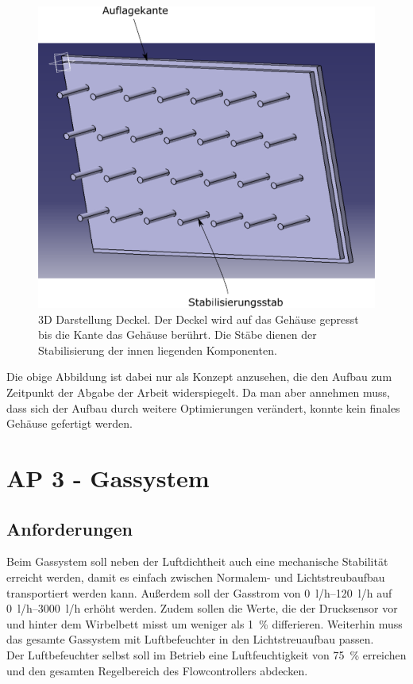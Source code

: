 \begin{figure}[h!]
	\begin{center}
		\includegraphics[scale=0.45]{Elektronik_Gehaeuse1.png}
		\caption[Gehäuse Deckel]{3D Darstellung Deckel. Der Deckel wird auf das Gehäuse gepresst bis die Kante das Gehäuse berührt. Die Stäbe dienen der Stabilisierung der innen liegenden Komponenten.}
	\end{center}
\end{figure}

Die obige Abbildung ist dabei nur als Konzept anzusehen, die den Aufbau zum Zeitpunkt der Abgabe der Arbeit widerspiegelt. Da man aber annehmen muss, dass sich der Aufbau durch weitere Optimierungen verändert, konnte kein finales Gehäuse gefertigt werden.


\clearpage

\section{AP 3 - Gassystem}

\subsection{Anforderungen}

Beim Gassystem soll neben der Luftdichtheit auch eine mechanische Stabilität erreicht werden, damit es einfach zwischen Normalem- und Lichtstreubaufbau transportiert werden kann. Außerdem soll der Gasstrom von \SIrange{0}{120}{l/h} auf \SIrange{0}{3000}{l/h} erhöht werden. Zudem sollen die Werte, die der Drucksensor vor und hinter dem Wirbelbett misst um weniger als \SI{1}{\%} differieren. Weiterhin muss das gesamte Gassystem mit Luftbefeuchter in den Lichtstreuaufbau passen. \\
Der Luftbefeuchter selbst soll im Betrieb eine Luftfeuchtigkeit von \SI{75}{\%} erreichen und den gesamten Regelbereich des Flowcontrollers abdecken.



